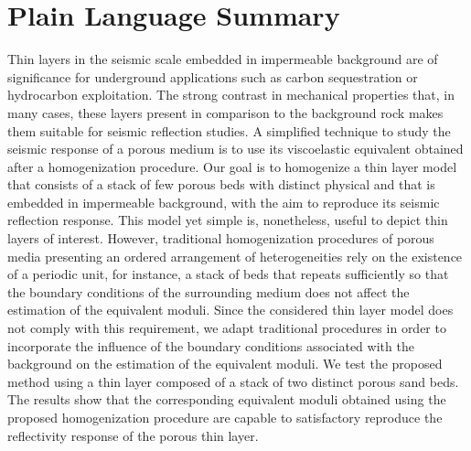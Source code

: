 \documentclass[draft]{agujournal2019}
\begin{document}
\section*{Plain Language Summary}
Thin layers in the seismic scale embedded in impermeable background are of significance for underground applications such as carbon sequestration or hydrocarbon exploitation. The strong contrast in mechanical properties that, in many cases, these layers present in comparison to the background rock makes them suitable for seismic reflection studies. A simplified technique to study the seismic response of a porous medium is to use its viscoelastic equivalent obtained after a homogenization procedure. Our goal is to  homogenize  a thin layer model that consists of a stack of few porous beds with distinct physical and that is embedded in impermeable background,  with the aim to reproduce its seismic reflection response. This model yet simple is, nonetheless, useful to depict thin layers of interest.
However, traditional homogenization procedures of porous media presenting an ordered arrangement of heterogeneities rely on the existence of a periodic unit, for instance, a stack of beds that repeats sufficiently so that the boundary conditions of the surrounding medium does not affect the estimation of the equivalent moduli. Since the considered thin layer model does not comply with this requirement, we adapt traditional procedures in order to incorporate the influence of the boundary conditions associated with the background on the estimation of the equivalent moduli. We test the proposed method using a thin layer composed of a stack of two distinct porous sand beds. The results show that the corresponding equivalent moduli obtained using the proposed homogenization procedure
 are capable to satisfactory reproduce the reflectivity response of the porous thin layer.

%
%
\end{document}
